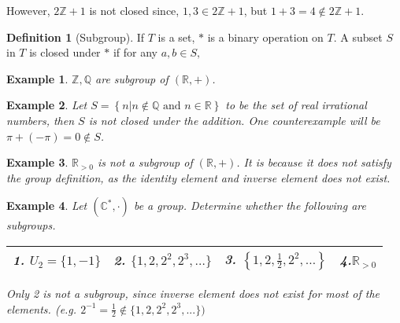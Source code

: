 \documentclass{article}
\theoremstyle{MyNonumberplain}
\theoremstyle{break}
\theoremstyle{break}
\newtheorem{example}{Example}[section]
\theoremstyle{break}
\theoremstyle{definition}
\theoremstyle{break}
\newtheorem{definition}{Definition}[section]
\begin{document}
However, $2\mathbb{Z}+ 1$ is not closed since, $1, 3 \in 2\mathbb{Z}+ 1$, but $1 + 3 = 4 \not\in 2\mathbb{Z}+ 1$.

\begin{defbox}
    \begin{definition}[Subgroup]
        If $T$ is a set, $*$ is a binary operation on $T$.\bigskip
        A subset $S$ in $T$ is closed under $*$ if for any $a,b\in S,$
    \end{definition}
\end{defbox}

\begin{expbox}
    \begin{example}
        $\mathbb{Z}, \mathbb{Q}$ are subgroup of $(\mathbb{R}, +)$.
    \end{example}
\end{expbox}

\begin{expbox}
    \begin{example}
        Let $S = \left\{ n|n \not\in \mathbb{Q} \text{ and } n \in \mathbb{R}
\right\}$ to be the set of real irrational numbers, then $S$ is not closed
under the addition. One counterexample will be $\pi + (- \pi) = 0 \not\in
S$.
    \end{example}
\end{expbox}

\begin{expbox}
    \begin{example}
        $\mathbb{R}_{> 0}$ is not a subgroup of $(\mathbb{R}, +)$. It is because
        it does not satisfy the group definition, as the identity element and inverse
        element does not exist.
    \end{example}
\end{expbox}

\begin{expbox}
    \begin{example}
        Let $(\mathbb{C}^{\ast}, \cdot)$ be a group. Determine whether the following are subgroups.

            {\noindent}\begin{tabularx}{1.0\textwidth}{|@{}X@{}|@{}X@{}|@{}X@{}|@{}X@{}|}
            \hline
            1. $U_2 = \{ 1, - 1 \}$ & 2. $\{ 1, 2, 2^2, 2^3, \ldots \}$ & 3. $\left\{ 1, 2,
            \frac{1}{2}, 2^2, \ldots \right\}$ & 4.$\mathbb{R}_{> 0}$\\
            
            \hline

            \end{tabularx}

            \begin{ansbox}
                Only 2 is not a subgroup, since inverse element does not exist for most of the elements.\bigskip
                (e.g. $2^{-1}=\frac{1}{2}\not\in \{1,2,2^2,2^3,...\})$
        
            \end{ansbox}
    \end{example}
\end{expbox}
\end{document}
